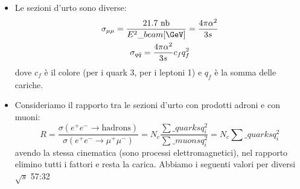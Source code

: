 \begin{itemize}
  \item Le sezioni d'urto sono diverse:
  \begin{gather*}
  \sigma_{\mu\mu}=\frac{21.7\text{ nb}}{E^2\_{beam}[\GeV]}=\frac{4\pi\alpha^2}{3s}\\
  \sigma_{q\bar q} =\frac{4\pi\alpha^2}{3s}c_fq_f^2
\end{gather*}
dove $c_f$ è il colore (per i quark 3, per i leptoni 1) e $q_f$ è la somma delle cariche.
\item Consideriamo il rapporto tra le sezioni d'urto con prodotti adroni e con muoni:
\begin{equation*}
R=\frac{\sigma(e^+e^-\to\text{hadrons})}{\sigma(e^+e^-\to\mu^+\mu^-)}=N_c\frac{\sum\_{quarks}q_i^2}{\sum\_{muons}q_i^2}=N_c\sum\_{quarks}q_i^2
\end{equation*}
avendo la stessa cinematica (sono processi elettromagnetici), nel rapporto elimino tutti i fattori e resta la carica. Abbiamo i seguenti valori per diversi $\sqrt s$ 57:32
\end{itemize}